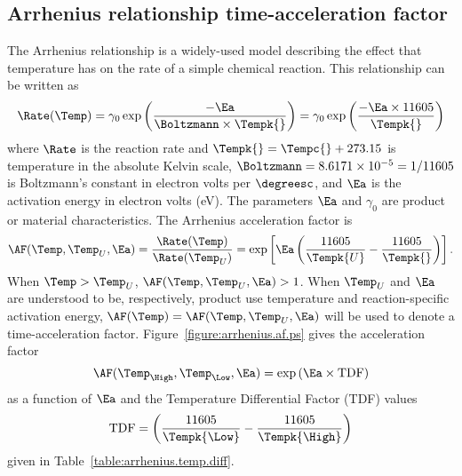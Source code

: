 \subsection{Arrhenius relationship time-acceleration factor}
\label{section:arrhenius.af}
The Arrhenius relationship is a widely-used model describing the effect
that temperature has on the rate of a simple chemical
reaction.  This relationship can be written as
\begin{equation}
\label{equation:arrhenius.rate}
\Rate(\Temp)=\gamma_{0} \exp\left(
\frac{-\Ea}{\Boltzmann\times
\Tempk{}} \right)
=
\gamma_{0}\exp\left(
\frac{-\Ea \times 11605}{\Tempk{}} \right)
\end{equation}
where $\Rate$ is the reaction rate and $\Tempk{}= \Tempc{} + 273.15$
is temperature in the absolute Kelvin scale, $\Boltzmann = 8.6171
\times 10^{-5} = 1/11605$ is Boltzmann's constant in electron volts
per $\degreesc$, and $\Ea$ is the activation energy in electron
volts (eV).  The parameters $\Ea$ and $\gamma_{0}$ are product or
material characteristics.  The Arrhenius acceleration
factor is
\begin{equation}
\label{equation:arrhenius.af}
\AF(\Temp,\Temp_{U},\Ea) = \frac{\Rate(\Temp)}{\Rate(\Temp_{U})} =  \exp\left[
\Ea\left( \frac{11605}{\Tempk{U}} -  \frac{11605}{\Tempk{}}
 \right) \right].
\end{equation}
When $\Temp > \Temp_{U}$, $\AF(\Temp,\Temp_{U},\Ea) > 1$.  When
$\Temp_{U}$ and $\Ea$ are understood to be, respectively, product use
temperature and reaction-specific activation energy,
$\AF(\Temp)=\AF(\Temp,\Temp_{U},\Ea)$ will be used to denote a
time-acceleration factor.  Figure~\ref{figure:arrhenius.af.ps} gives the
acceleration factor
\begin{displaymath}
\AF(\Temp_{\High},\Temp_{\Low},\Ea) =  \exp\left(
\Ea \times \mbox{TDF}  \right)
\end{displaymath} 
as a function of $\Ea$ and the Temperature Differential Factor (TDF) values
\begin{displaymath}
\mbox{TDF}=
	\left(\frac{11605}
		   {\Tempk{\Low}}
	   -  \frac{11605}
		   {\Tempk{\High}}
	\right )
\end{displaymath}
given in Table~\ref{table:arrhenius.temp.diff}. 


